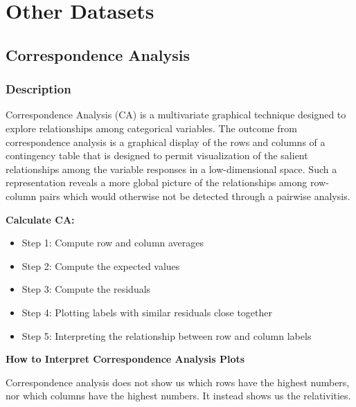\documentclass[]{book}
\providecommand{\tightlist}{%
  \setlength{\itemsep}{0pt}\setlength{\parskip}{0pt}}
\begin{document}
\hypertarget{part-other-datasets}{%
\part{Other Datasets}\label{part-other-datasets}}

\hypertarget{correspondence-analysis}{%
\chapter{Correspondence Analysis}\label{correspondence-analysis}}

\hypertarget{description-7}{%
\section{Description}\label{description-7}}

Correspondence Analysis (CA) is a multivariate graphical technique
designed to explore relationships among categorical variables. The
outcome from correspondence analysis is a graphical display of the rows
and columns of a contingency table that is designed to permit
visualization of the salient relationships among the variable responses
in a low-dimensional space. Such a representation reveals a more global
picture of the relationships among row-column pairs which would
otherwise not be detected through a pairwise analysis.

\textbf{Calculate CA:}

\begin{itemize}
\tightlist
\item
  Step 1: Compute row and column averages
\item
  Step 2: Compute the expected values
\item
  Step 3: Compute the residuals
\item
  Step 4: Plotting labels with similar residuals close together
\item
  Step 5: Interpreting the relationship between row and column labels
\end{itemize}

\textbf{How to Interpret Correspondence Analysis Plots}

Correspondence analysis does not show us which rows have the highest
numbers, nor which columns have the highest numbers. It instead shows us
the relativities.
\end{document}

